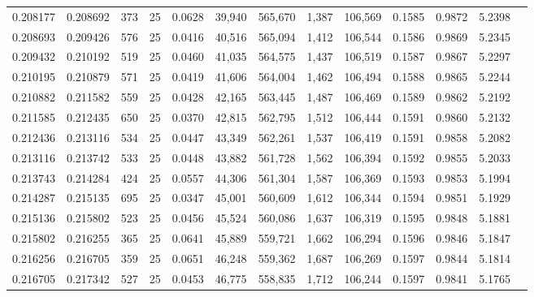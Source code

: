 \begin{tabular}{rrrrrrrrrrrrr}
0.208177 & 0.208692 &   373 &  25 &                                     0.0628 &  39,940 & 565,670 &   1,387 & 106,569 & 0.1585 & 0.9872 & 5.2398 \\
0.208693 & 0.209426 &   576 &  25 &                                     0.0416 &  40,516 & 565,094 &   1,412 & 106,544 & 0.1586 & 0.9869 & 5.2345 \\
0.209432 & 0.210192 &   519 &  25 &                                     0.0460 &  41,035 & 564,575 &   1,437 & 106,519 & 0.1587 & 0.9867 & 5.2297 \\
0.210195 & 0.210879 &   571 &  25 &                                     0.0419 &  41,606 & 564,004 &   1,462 & 106,494 & 0.1588 & 0.9865 & 5.2244 \\
0.210882 & 0.211582 &   559 &  25 &                                     0.0428 &  42,165 & 563,445 &   1,487 & 106,469 & 0.1589 & 0.9862 & 5.2192 \\
0.211585 & 0.212435 &   650 &  25 &                                     0.0370 &  42,815 & 562,795 &   1,512 & 106,444 & 0.1591 & 0.9860 & 5.2132 \\
0.212436 & 0.213116 &   534 &  25 &                                     0.0447 &  43,349 & 562,261 &   1,537 & 106,419 & 0.1591 & 0.9858 & 5.2082 \\
0.213116 & 0.213742 &   533 &  25 &                                     0.0448 &  43,882 & 561,728 &   1,562 & 106,394 & 0.1592 & 0.9855 & 5.2033 \\
0.213743 & 0.214284 &   424 &  25 &                                     0.0557 &  44,306 & 561,304 &   1,587 & 106,369 & 0.1593 & 0.9853 & 5.1994 \\
0.214287 & 0.215135 &   695 &  25 &                                     0.0347 &  45,001 & 560,609 &   1,612 & 106,344 & 0.1594 & 0.9851 & 5.1929 \\
0.215136 & 0.215802 &   523 &  25 &                                     0.0456 &  45,524 & 560,086 &   1,637 & 106,319 & 0.1595 & 0.9848 & 5.1881 \\
0.215802 & 0.216255 &   365 &  25 &                                     0.0641 &  45,889 & 559,721 &   1,662 & 106,294 & 0.1596 & 0.9846 & 5.1847 \\
0.216256 & 0.216705 &   359 &  25 &                                     0.0651 &  46,248 & 559,362 &   1,687 & 106,269 & 0.1597 & 0.9844 & 5.1814 \\
0.216705 & 0.217342 &   527 &  25 &                                     0.0453 &  46,775 & 558,835 &   1,712 & 106,244 & 0.1597 & 0.9841 & 5.1765 \\

\end{tabular}
